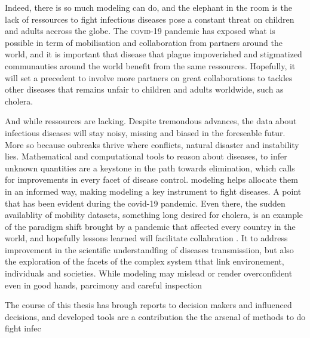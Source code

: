 Indeed, there is so much modeling can do, and the elephant in the room is the lack of ressources to fight infectious diseases pose a constant threat on children and adults accross the globe. The \textsc{covid}-19 pandemic has exposed what is possible in term of mobilisation and collaboration from partners around the world, and it is important that disease that plague impoverished and stigmatized communauties around the world benefit from the same ressources. Hopefully, it will set a precedent to involve more partners on great collaborations to tackles other diseases that remains unfair to children and adults worldwide, such as cholera.



And while ressources are lacking. Despite tremondous advances, the data about infectious diseases will stay noisy, missing and biased in the foreseable futur. More so because oubreaks thrive where conflicts, natural disaster and instability lies. Mathematical and computational tools to reason about diseases, to infer unknown quantities are a keystone in the path towards elimination, which calls for improvements in every facet of disease control. 
modeling helps allocate them in an informed way, making modeling a key instrument to fight diseases. A point that has been evident during the covid-19 pandemic. Even there, the sudden availablity of mobility datasets, something long desired for cholera, is an example of the paradigm shift brought by a pandemic that affected every country in the world, and hopefully lessons learned will facilitate collabration 
. It  to address improvement in the scientific understandfing of diseases transmissiion, but also the exploration of the facets of the complex system tthat link environement, individuals and societies. While modeling may mislead or render overconfident even in good hands, parcimony and careful inspection 


The course of this thesis has brough reports to decision makers and influenced decisions, and developed tools are a contribution the the arsenal of methods to do fight infec
